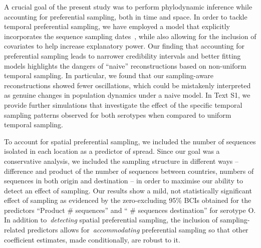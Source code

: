 \documentclass[10pt]{article}
\begin{document}

A crucial goal of the present study was to perform phylodynamic inference while accounting for preferential sampling, both in time and space.
In order to tackle temporal preferential sampling, we have employed a model that explicitly incorporates the sequence sampling dates~\citep{Karcher2020}, while also allowing for the inclusion of covariates to help increase explanatory power.
Our finding that accounting for preferential sampling leads to narrower credibility intervals and better fitting models highlights the dangers of ``naive'' reconstructions based on non-uniform temporal sampling.
In particular, we found that our sampling-aware reconstructions showed fewer oscillations, which could be mistakenly interpreted as genuine changes in population dynamics under a naive model. 
In Text S1, we provide further simulations that investigate the effect of the specific temporal sampling patterns observed for both serotypes when compared to uniform temporal sampling.

To account for spatial preferential sampling, we included the number of sequences isolated in each location as a predictor of spread. 
Since our goal was a conservative analysis, we included the sampling structure in different ways -- difference and product of the number of sequences between countries, numbers of sequences in both origin and destination -- in order to maximise our ability to detect an effect of sampling.
Our results show a mild, not statistically significant effect of sampling as evidenced by the zero-excluding 95\% BCIs obtained for the predictors ``Product \# sequences'' and `` \# sequences destination'' for serotype O.
In addition to~\textit{detecting} spatial preferential sampling, the inclusion of sampling-related predictors allows for~\textit{accommodating} preferential sampling so that other coefficient estimates, made conditionally, are robust to it.
\end{document}
